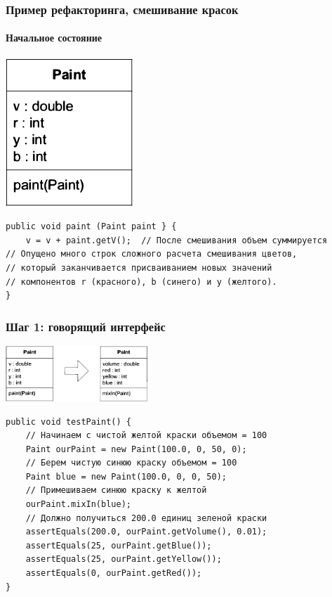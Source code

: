 \documentclass[xetex,mathserif,serif]{beamer}
\begin{document}
    \begin{frame}[fragile]
        \frametitle{Пример рефакторинга, смешивание красок}
        \framesubtitle{Начальное состояние}
        \begin{center}
            \includegraphics[height=0.3\textheight]{originalPaint.png}
        \end{center}
        \begin{footnotesize}
            \begin{verbatim}
public void paint (Paint paint } {
    v = v + paint.getV();  // После смешивания объем суммируется
// Опущено много строк сложного расчета смешивания цветов,
// который заканчивается присваиванием новых значений
// компонентов r (красного), b (синего) и y (желтого).
}
            \end{verbatim}
        \end{footnotesize}
\end{frame}

    \begin{frame}[fragile]
        \frametitle{Шаг 1: говорящий интерфейс}
        \begin{center}
            \includegraphics[width=0.4\textwidth]{informativeInterfaceForPaint.png}
        \end{center}
        \begin{footnotesize}
            \begin{verbatim}
public void testPaint() {
    // Начинаем с чистой желтой краски объемом = 100
    Paint ourPaint = new Paint(100.0, 0, 50, 0);
    // Берем чистую синюю краску объемом = 100
    Paint bluе = new Paint(100.0, 0, 0, 50);
    // Примешиваем синюю краску к желтой
    ourPaint.mixIn(blue); 
    // Должно получиться 200.0 единиц зеленой краски
    assertEquals(200.0, ourPaint.getVolume(), 0.01);
    assertEquals(25, ourPaint.getBlue());
    assertEquals(25, ourPaint.getYellow());
    assertEquals(0, ourPaint.getRed());
}
            \end{verbatim}
        \end{footnotesize}
\end{frame}
\end{document}
